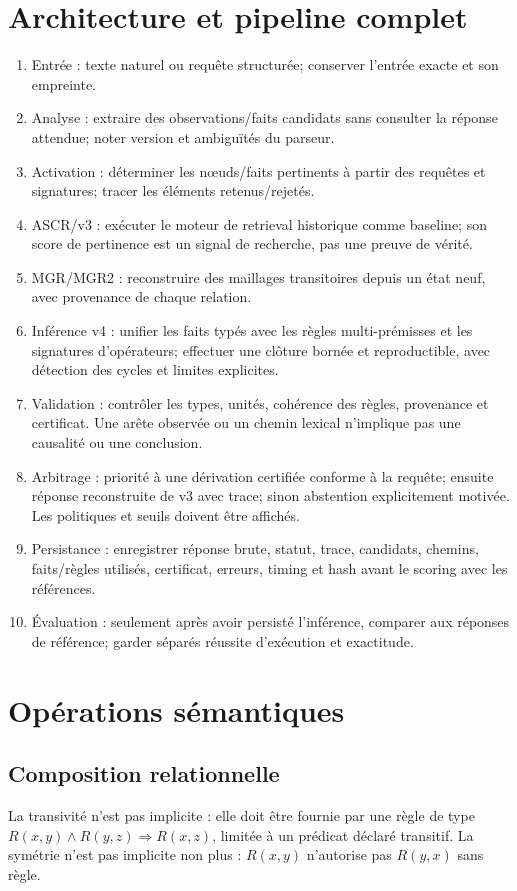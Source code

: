 \documentclass[11pt,a4paper]{book}
\begin{document}
\chapter{Architecture et pipeline complet}
\begin{enumerate}[label=\arabic*.]
\item Entrée : texte naturel ou requête structurée; conserver l'entrée exacte et son empreinte.
\item Analyse : extraire des observations/faits candidats sans consulter la réponse attendue; noter version et ambiguïtés du parseur.
\item Activation : déterminer les nœuds/faits pertinents à partir des requêtes et signatures; tracer les éléments retenus/rejetés.
\item ASCR/v3 : exécuter le moteur de retrieval historique comme baseline; son score de pertinence est un signal de recherche, pas une preuve de vérité.
\item MGR/MGR2 : reconstruire des maillages transitoires depuis un état neuf, avec provenance de chaque relation.
\item Inférence v4 : unifier les faits typés avec les règles multi-prémisses et les signatures d'opérateurs; effectuer une clôture bornée et reproductible, avec détection des cycles et limites explicites.
\item Validation : contrôler les types, unités, cohérence des règles, provenance et certificat. Une arête observée ou un chemin lexical n'implique pas une causalité ou une conclusion.
\item Arbitrage : priorité à une dérivation certifiée conforme à la requête; ensuite réponse reconstruite de v3 avec trace; sinon abstention explicitement motivée. Les politiques et seuils doivent être affichés.
\item Persistance : enregistrer réponse brute, statut, trace, candidats, chemins, faits/règles utilisés, certificat, erreurs, timing et hash avant le scoring avec les références.
\item Évaluation : seulement après avoir persisté l'inférence, comparer aux réponses de référence; garder séparés réussite d'exécution et exactitude.
\end{enumerate}

\chapter{Opérations sémantiques}
\section{Composition relationnelle}
La transivité n'est pas implicite : elle doit être fournie par une règle de type $R(x,y)\land R(y,z)\Rightarrow R(x,z)$, limitée à un prédicat déclaré transitif. La symétrie n'est pas implicite non plus : $R(x,y)$ n'autorise pas $R(y,x)$ sans règle.
\end{document}
